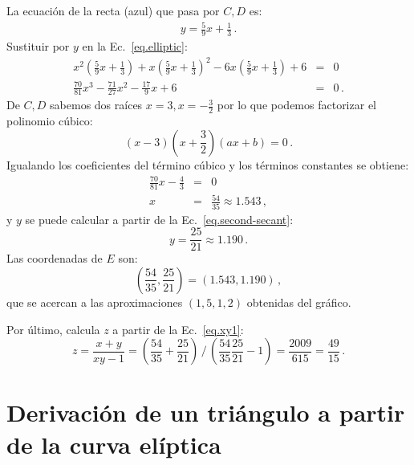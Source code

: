 La ecuación de la recta (azul) que pasa por $C,D$ es:
\begin{align}
y = \frac{5}{9}x + \frac{1}{3}\,.\label{eq.second-secant}
\end{align}
Sustituir por $y$ en la Ec.~\ref{eq.elliptic}:
\begin{eqnarray*}
x^2\left(\frac{5}{9}x + \frac{1}{3}\right) + x\left(\frac{5}{9}x + \frac{1}{3}\right)^2 -6x\left(\frac{5}{9}x + \frac{1}{3}\right) +6 &=&0\\
\frac{70}{81}x^3 - \frac{71}{27}x^2 - \frac{17}{9}x +6 &=&0\,.
\end{eqnarray*}
De $C,D$ sabemos dos raíces $x=3,x=-\frac{3}{2}$ por lo que podemos factorizar el polinomio cúbico:
\[
(x-3)\left(x+\frac{3}{2}\right)(ax+b)=0\,.
\]
Igualando los coeficientes del término cúbico y los términos constantes se obtiene:
\begin{eqnarray*}
\frac{70}{81}x - \frac{4}{3}&=&0\\
x&=& \frac{54}{35}\approx 1.543\,,
\end{eqnarray*}
y $y$ se puede calcular a partir de la Ec.~\ref{eq.second-secant}:
\[
y=\frac{25}{21}\approx 1.190\,.
\]
Las coordenadas de $E$ son:
\[
\left(\frac{54}{35}, \frac{25}{21}\right)=(1.543,1.190)\,,
\]
que se acercan a las aproximaciones $(1,5,1,2)$ obtenidas del gráfico.

Por último, calcula $z$ a partir de la Ec.~\ref{eq.xy1}:
\[
z=\frac{x+y}{xy-1}=%
\displaystyle\left(\frac{54}{35} + \frac{25}{21}\right)%
 \, \bigg/ \,%
\displaystyle\left(\frac{54}{35}\frac{25}{21}-1\right)=%
\frac{2009}{615} = \frac{49}{15}\,.
\]

\section{Derivación de un triángulo a partir de la curva elíptica}

